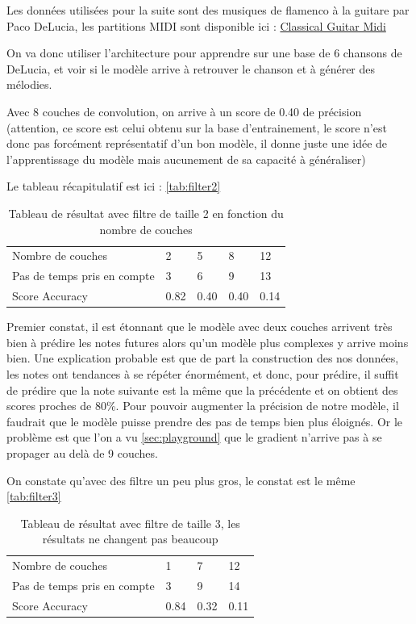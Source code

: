 \documentclass[a4paper]{article}
\begin{document}
Les données utilisées pour la suite sont des musiques de flamenco à la guitare par Paco DeLucia, les partitions MIDI sont disponible ici : \href{http://www.classicalguitarmidi.com/}{Classical Guitar Midi}

On va donc utiliser l'architecture pour apprendre sur une base de 6 chansons de DeLucia, et voir si le modèle arrive à retrouver le chanson et à générer des mélodies.

Avec 8 couches de convolution, on arrive à un score de 0.40 de précision (attention, ce score est celui obtenu sur la base d'entrainement, le score n'est donc pas forcément représentatif d'un bon modèle, il donne juste une idée de l'apprentissage du modèle mais aucunement de sa capacité à généraliser)

Le tableau récapitulatif est ici : \autoref{tab:filter2}

\begin{table}[ht]
  \centering
  \caption{Tableau de résultat avec filtre de taille 2 en fonction du nombre de couches}
  \label{tab:filter2}
  \begin{tabular}{lllll}
    Nombre de couches           & 2    & 5 & 8  & 12 \\
    Pas de temps pris en compte & 3    & 6 & 9  & 13 \\
    Score Accuracy              & 0.82 & 0.40  & 0.40 & 0.14   
  \end{tabular}
\end{table}

Premier constat, il est étonnant que le modèle avec deux couches arrivent très bien à prédire les notes futures alors qu'un modèle plus complexes y arrive moins bien.
Une explication probable est que de part la construction des nos données, les notes ont tendances à se répéter énormément, et donc, pour prédire, il suffit de prédire que la note suivante est la même que la précédente et on obtient des scores proches de 80\%. Pour pouvoir augmenter la précision de notre modèle, il faudrait que le modèle puisse prendre des pas de temps bien plus éloignés. Or le problème est que l'on a vu \autoref{sec:playground} que le gradient n'arrive pas à se propager au delà de 9 couches.

On constate qu'avec des filtre un peu plus gros, le constat est le même \autoref{tab:filter3}
\begin{table}[ht]
  \centering
  \caption{Tableau de résultat avec filtre de taille 3, les résultats ne changent pas beaucoup}
  \label{tab:filter3}
  \begin{tabular}{llll}
    Nombre de couches           & 1    & 7  & 12 \\
    Pas de temps pris en compte & 3    & 9  & 14 \\
    Score Accuracy              & 0.84 & 0.32 & 0.11   
  \end{tabular}
\end{table}
\end{document}
